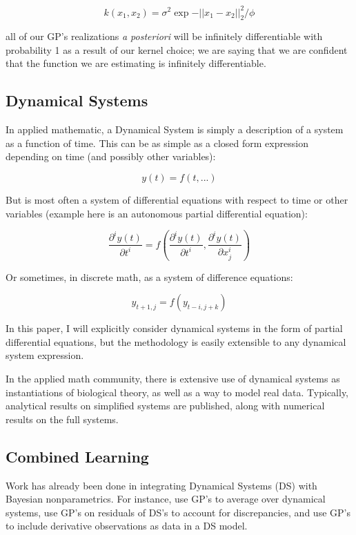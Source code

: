 \documentclass{article}
\begin{document}
	 $$k(x_1,x_2) = \sigma^2 \exp{-||x_1 - x_2||_2^2 / \phi}$$
	 
	 all of our GP's realizations \textit{a posteriori} will be infinitely differentiable with probability 1 as a result of our kernel choice; we are saying that we are confident that the function we are estimating is infinitely differentiable.
	 
	 \subsection{Dynamical Systems}
	
	In applied mathematic, a Dynamical System is simply a description of a system as a function of time. This can be as simple as a closed form expression depending on time (and possibly other variables):
	
	$$y(t) = f(t,...)$$
	
	But is most often a system of differential equations with respect to time or other variables (example here is an autonomous partial differential equation):
	
	$$\frac{\partial^i y(t)}{\partial t^i} = f(\frac{\partial^i y(t)}{\partial t^i}, \frac{\partial^i y(t)}{\partial x_j^i})$$
	
	Or sometimes, in discrete math, as a system of difference equations:
	
	$$y_{t+1, j} = f(y_{t-i,j+k})$$
	
	In this paper, I will explicitly consider dynamical systems in the form of partial differential equations, but the methodology is easily extensible to any dynamical system expression.
	
	In the applied math community, there is extensive use of dynamical systems as instantiations of biological theory, as well as a way to model real data. Typically, analytical results on simplified systems are published, along with numerical results on the full systems.
	
	\subsection{Combined Learning}
	
	Work has already been done in integrating Dynamical Systems (DS) with Bayesian nonparametrics. For instance, \cite{wang2005gaussian} use GP's to average over dynamical systems, \cite{ko2007gaussian} use GP's on residuals of DS's to account for discrepancies, and \cite{solak2003derivative} use GP's to include derivative observations as data in a DS model.
	
\end{document}
